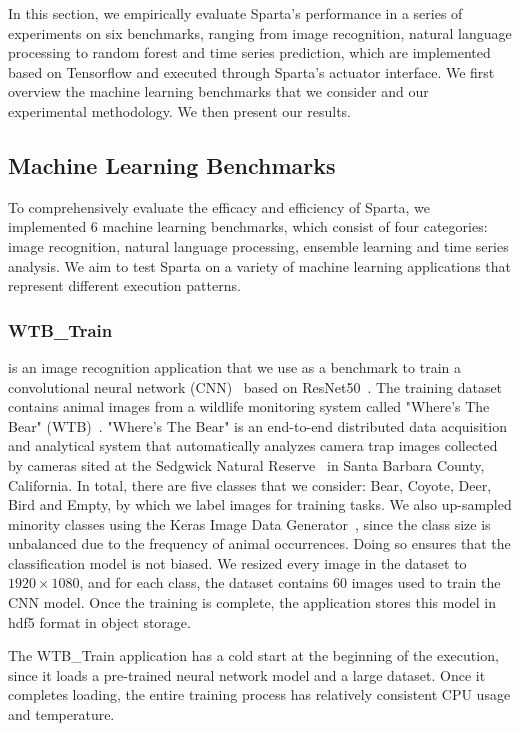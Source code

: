 In this section, we empirically evaluate Sparta's performance in a series of experiments on six benchmarks, ranging from image recognition, natural language processing to random forest and time series prediction, which are implemented based on Tensorflow and executed through Sparta's actuator interface. We first overview the machine learning benchmarks that we consider and our experimental methodology. We then present our results.

\subsection{Machine Learning Benchmarks}

To comprehensively evaluate the efficacy and efficiency of Sparta, we implemented 6 machine learning benchmarks, which consist of four categories: image recognition, natural language processing, ensemble learning and time series analysis. We aim to test Sparta on a variety of machine learning applications that represent different execution patterns.

\subsubsection{WTB\_Train}

is an image recognition application that we use as a benchmark to train a convolutional neural network (CNN)~\cite{ref:cnn} based on ResNet50~\cite{ref:resnet}. The training dataset contains animal images from a wildlife monitoring system called "Where's The Bear" (WTB)~\cite{ref:wtb}. "Where's The Bear" is an end-to-end distributed data acquisition and analytical system that automatically analyzes camera trap images collected by cameras sited at the Sedgwick Natural Reserve~\cite{ref:sedgwick} in Santa Barbara County, California. In total, there are five classes that we consider: Bear, Coyote, Deer, Bird and Empty, by which we label images for training tasks. We also up-sampled minority classes using the Keras Image Data Generator~\cite{ref:datagen}, since the class size is unbalanced due to the frequency of animal occurrences. Doing so ensures that the classification model is not biased. We resized every image in the dataset to $1920 \times 1080$, and for each class, the dataset contains 60 images used to train the CNN model. Once the training is complete, the application stores this model in hdf5 format in object storage. 

The WTB\_Train application has a cold start at the beginning of the execution, since it loads a pre-trained neural network model and a large dataset. Once it completes loading, the entire training process has relatively consistent CPU usage and temperature. 

